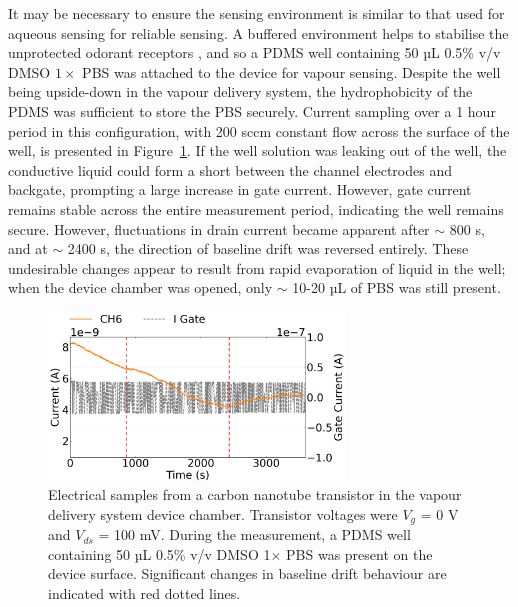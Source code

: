\documentclass[
  a4paper,
]{scrbook}
\begin{document}
It may be necessary to ensure the sensing environment is similar to that
used for aqueous sensing for reliable sensing. A buffered environment
helps to stabilise the unprotected odorant receptors
\autocite{Sato2014}, and so a PDMS well containing 50 µL 0.5\% v/v DMSO
\(1 \times\) PBS was attached to the device for vapour sensing. Despite
the well being upside-down in the vapour delivery system, the
hydrophobicity of the PDMS was sufficient to store the PBS securely.
Current sampling over a 1 hour period in this configuration, with 200
sccm constant flow across the surface of the well, is presented in
Figure~\ref{fig-buffer-vapour}. If the well solution was leaking out of
the well, the conductive liquid could form a short between the channel
electrodes and backgate, prompting a large increase in gate current.
However, gate current remains stable across the entire measurement
period, indicating the well remains secure. However, fluctuations in
drain current became apparent after \(\sim\) 800 s, and at \(\sim\) 2400
s, the direction of baseline drift was reversed entirely. These
undesirable changes appear to result from rapid evaporation of liquid in
the well; when the device chamber was opened, only \(\sim\) 10-20 µL of
PBS was still present.

\begin{figure}

{\centering \includegraphics[width=0.7\textwidth,height=\textheight]{figures/ch9/Q39C11.png}

}

\caption[Electrical samples from a carbon nanotube transistor in the
vapour delivery system device chamber, where 50 µL 0.5\% v/v DMSO
1\(\times\) PBS was present on the device
surface.]{\label{fig-buffer-vapour}Electrical samples from a carbon
nanotube transistor in the vapour delivery system device chamber.
Transistor voltages were \(V_{g}\) = 0 V and \(V_{ds}\) = 100 mV. During
the measurement, a PDMS well containing 50 µL 0.5\% v/v DMSO 1\(\times\)
PBS was present on the device surface. Significant changes in baseline
drift behaviour are indicated with red dotted lines.}

\end{figure}
\end{document}
